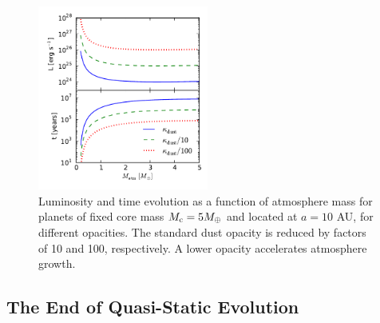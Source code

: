 \documentclass[apj]{emulateapj}
\begin{document}
 \begin{figure}[h]
\centering
\includegraphics[width=0.5\textwidth]{../../figs/ModelAtmospheres/RadSelfGravPoly/PaperFigs/opacity_effect.pdf}
\caption{Luminosity and time evolution as a function of atmosphere mass for planets of fixed core mass $M_{\rm c}=5 M_{\oplus}$ and located at $a=10$ AU, for different opacities. The standard dust opacity is reduced by factors of 10 and 100, respectively. A lower opacity accelerates atmosphere growth.}
\label{fig:LtvsMopacity}
\end{figure}







\subsection{The End of Quasi-Static Evolution}
\label{endoftime}
\end{document}

